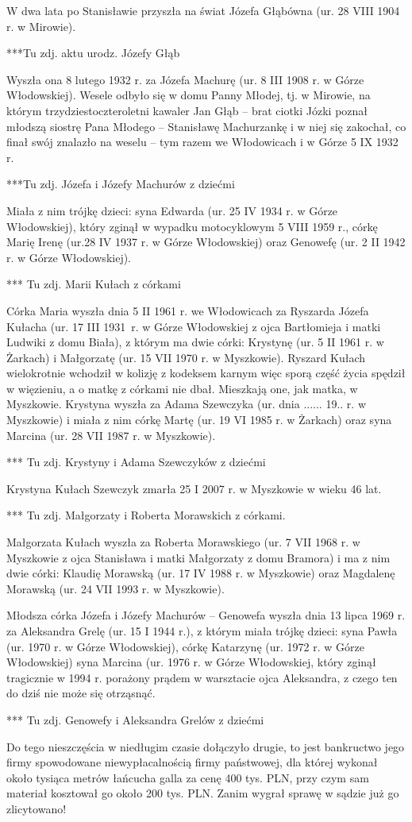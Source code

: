 W dwa lata po Stanisławie przyszła na świat Józefa Głąbówna (ur. 28 VIII 1904 r. w Mirowie).

***Tu zdj. aktu urodz. Józefy Głąb

Wyszła ona 8 lutego 1932 r. za Józefa Machurę (ur. 8 III 1908 r. w Górze Włodowskiej). Wesele odbyło się w domu Panny Młodej, tj. w Mirowie, na którym trzydziestoczteroletni kawaler Jan Głąb -- brat ciotki Józki poznał młodszą siostrę Pana Młodego -- Stanisławę Machurzankę i w niej się zakochał, co finał swój znalazło na weselu -- tym razem we Włodowicach i w Górze 5 IX 1932 r.

{\color{red}
***Tu zdj. Józefa i Józefy Machurów z dziećmi}

Miała z nim trójkę dzieci: syna Edwarda (ur. 25 IV 1934 r. w Górze Włodowskiej), który zginął w wypadku motocyklowym 5 VIII 1959 r., córkę Marię Irenę (ur.28 IV 1937 r. w Górze Włodowskiej) oraz Genowefę (ur. 2 II 1942 r. w Górze Włodowskiej).

{\color{red}
*** Tu zdj. Marii Kułach z córkami}

Córka Maria wyszła dnia 5 II 1961 r. we Włodowicach za Ryszarda Józefa Kułacha (ur. 17 III 1931~r. w Górze Włodowskiej z ojca Bartłomieja i matki Ludwiki z domu Biała), z którym ma dwie córki: Krystynę (ur. 5 II 1961 r. w Żarkach) i Małgorzatę (ur. 15 VII 1970 r. w Myszkowie). Ryszard Kułach wielokrotnie wchodził w kolizję z kodeksem karnym więc sporą część życia spędził w więzieniu, a o matkę z córkami nie dbał. Mieszkają one, jak matka, w Myszkowie. Krystyna wyszła za Adama Szewczyka 
(ur. dnia ...... 19.. r. w Myszkowie) i miała z nim córkę Martę (ur. 19 VI 1985 r. w Żarkach) oraz syna Marcina (ur. 28 VII 1987 r. w Myszkowie).

{\color{red}
*** Tu zdj. Krystyny i Adama Szewczyków z dziećmi}

Krystyna Kułach Szewczyk zmarła 25 I 2007 r. w Myszkowie w wieku 46 lat.

{\color{red}
*** Tu zdj. Małgorzaty i Roberta Morawskich z córkami.}

Małgorzata Kułach wyszła za Roberta Morawskiego (ur. 7 VII 1968 r. w Myszkowie z ojca Stanisława i matki Małgorzaty z domu Bramora) i ma z nim dwie córki: Klaudię Morawską (ur. 17 IV 1988 r. w Myszkowie) oraz Magdalenę Morawską (ur. 24 VII 1993 r. w Myszkowie). 

Młodsza  córka Józefa i Józefy Machurów -- Genowefa wyszła dnia 13 lipca 1969 r. za Aleksandra Grelę (ur. 15 I 1944 r.), z którym miała trójkę dzieci: syna Pawła (ur. 1970 r. w Górze Włodowskiej), córkę Katarzynę (ur. 1972 r. w Górze Włodowskiej) syna Marcina (ur. 1976 r. w Górze Włodowskiej, który zginął tragicznie w 1994 r. porażony prądem w warsztacie ojca Aleksandra, z czego ten do dziś nie może się otrząsnąć.

{\color{red}
*** Tu zdj. Genowefy i Aleksandra Grelów z dziećmi}

Do tego nieszczęścia w niedługim czasie dołączyło drugie, to jest bankructwo jego firmy spowodowane niewypłacalnością firmy państwowej, dla której wykonał około tysiąca metrów łańcucha galla za cenę 400 tys. PLN, przy czym sam materiał kosztował go około 200 tys. PLN. Zanim wygrał sprawę w sądzie już go zlicytowano!
